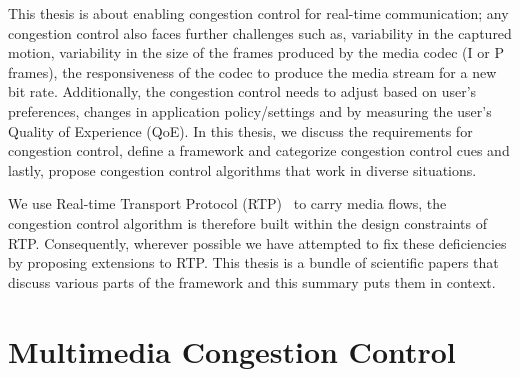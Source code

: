
This thesis is about enabling congestion control for real-time communication;
any congestion control also faces further challenges such as, variability in
the captured motion, variability in the size of the frames produced by the
media codec (I or P frames), the responsiveness of the codec to produce the
media stream for a new bit rate. Additionally, the congestion control needs to
adjust based on user's preferences, changes in application policy/settings and
by measuring the user's Quality of Experience (QoE). In this thesis, we
discuss the requirements for congestion control, define a framework and
categorize congestion control cues and lastly, propose congestion control
algorithms that work in diverse situations.



We use Real-time Transport Protocol (RTP)~\cite{rfc3550} to carry media flows,
the congestion control algorithm is therefore built within the design
constraints of RTP. Consequently, wherever possible we have attempted to fix
these deficiencies by proposing extensions to RTP. This thesis is a bundle of
scientific papers that discuss various parts of the framework and this summary
puts them in context.


\section{Multimedia Congestion Control}

